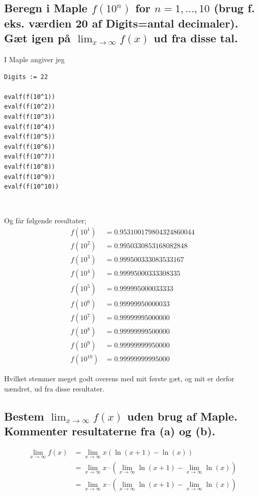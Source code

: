 \documentclass[11pt,a4paper]{article}
\newcommand{\limit}[2]{\lim_{#1 \rightarrow #2}}
\begin{document}
\subsection
{
    \mdseries
    Beregn i Maple $f(10^n)$ for $n = 1, \dots, 10$ (brug f. eks. værdien 20
    af Digits=antal decimaler). Gæt igen på $\limit{x}{\infty} f(x)$ ud fra
    disse tal.
}
\begin{multicols}{2}
    
    I Maple angiver jeg
\begin{lstlisting}
Digits := 22

evalf(f(10^1))
evalf(f(10^2))
evalf(f(10^3))
evalf(f(10^4))
evalf(f(10^5))
evalf(f(10^6))
evalf(f(10^7))
evalf(f(10^8))
evalf(f(10^9))
evalf(f(10^10))
\end{lstlisting}

    \vfill{\ }\columnbreak

    Og får følgende resultater;
    \begin{align}
        f(10^1)     &= 0.953100179804324860044 \\
        f(10^2)     &= 0.9950330853168082848 \\
        f(10^3)     &= 0.999500333083533167 \\
        f(10^4)     &= 0.99995000333308335 \\
        f(10^5)     &= 0.999995000033333 \\
        f(10^6)     &= 0.99999950000033 \\
        f(10^7)     &= 0.99999995000000 \\
        f(10^8)     &= 0.99999999500000 \\
        f(10^9)     &= 0.99999999950000 \\
        f(10^{10})  &= 0.99999999995000
    \end{align}

\end{multicols}

Hvilket stemmer meget godt overens med mit første gæt, og mit er derfor
uændret, ud fra disse resultater.

\subsection
{
    \mdseries
    Bestem $\limit{x}{\infty} f(x)$ uden brug af Maple. Kommenter resultaterne
    fra (a) og (b).
}
\begin{align}
    \limit{x}{\infty} f(x)
    &= \limit{x}{\infty} x (\ln(x + 1) - \ln(x)) \\
    &= \limit{x}{\infty} x
       \cdot
       \left(
           \limit{x}{\infty} \ln(x + 1) - \limit{x}{\infty} \ln(x)
       \right) \\
    &= \limit{x}{\infty} x
       \cdot
       \left(
           \limit{x}{\infty} \ln(x + 1) - \limit{x}{\infty} \ln(x)
       \right)
\end{align}
\end{document}
